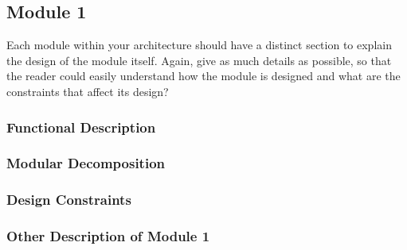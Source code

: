 \subsection{Module 1}
Each module within your architecture should have a distinct section to explain the design of the module itself. Again, give as much details as possible, so that the reader could easily understand how the module is designed and what are the constraints that affect its design?

\subsubsection{Functional Description}
\subsubsection{Modular Decomposition}
\subsubsection{Design Constraints}
\subsubsection{Other Description of Module 1}